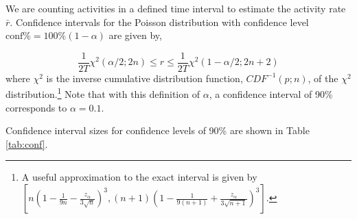 \documentclass{article}
\begin{document}
We 
\reversemarginpar\marginpar{\raggedleft
%
    \begin{tikzpicture}[scale=0.26]]
\draw [red, very thick, rotate around={0: (0, 0)}] (-0.7, -0.7) rectangle(3.7, 0.7);
%
\draw [very thick, <->] (0.25000000000000006, 0.4330127018922193) -- (1.25, 2.165063509461097) ;
\draw [very thick, <->] (1.75, 2.165063509461097) -- (2.75, 0.4330127018922193) ;
\draw [very thick, <->] (2.5, 0) -- (0.5, 0) ;
%
\draw [orange, ultra thick] (0,0) circle [radius= 0.5 ];
\draw [yellow, ultra thick] ( 1.5 , 2.59807621135 ) circle [radius= 0.5 ];
\draw [green,  ultra thick] ( 3.0 , 0 ) circle [radius= 0.5 ];
    \end{tikzpicture}
%
%
}
are counting activities in a defined time interval to estimate the activity rate $\bar{r}$. Confidence intervals \cite{George:2012} for the
Poisson distribution with confidence level $\text{conf\%} = 100\%(1-\alpha)$ are given by,

\begin{equation}
    \label{eq:chisqconf}
    \frac{1}{2T} \chi^2(\alpha/2;2n) \leq r \leq \frac{1}{2T} \chi^2(1-\alpha/2;2n+2)
\end{equation}
where $\chi^2$ is the inverse cumulative distribution function, $CDF^{-1}(p; n)$, of the $\chi^2$ distribution.\footnote{A useful approximation to the exact interval is given by  $[ n(1 - \frac{1}{9n} - \frac{z_{\alpha}}{3\sqrt{n}})^3 , (n+1)(1- \frac{1}{9(n+1)} + \frac{z_{\alpha}}{3\sqrt{n+1}})^3]$. }
Note that with this definition of $\alpha$, a confidence interval of 90\% corresponds to $\alpha=0.1$.

Confidence interval sizes for confidence levels of 90\% are shown in Table \ref{tab:conf}.
\end{document}
